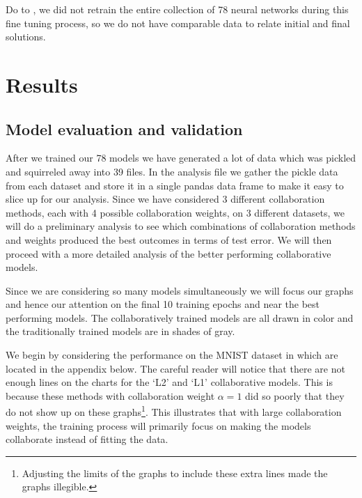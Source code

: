 \documentclass[english,a4paper,oneside]{amsart}
\theoremstyle{definition}
\begin{document}
Do to , we did not retrain the entire collection of 78 neural networks during this fine tuning process, so we do not have comparable data to relate initial and final solutions. 

\section{Results}
\subsection{Model evaluation and validation}
After we trained our 78 models we have generated a lot of data which was pickled and squirreled away into 39 files. In the analysis file we gather the pickle data from each dataset and store it in a single pandas data frame to make it easy to slice up for our analysis. Since we have considered 3 different collaboration methods, each with 4 possible collaboration weights, on 3 different datasets, we will do a preliminary analysis to see which combinations of collaboration methods and weights produced the best outcomes in terms of test error. We will then proceed with a more detailed analysis of the better performing collaborative models. 

Since we are considering so many models simultaneously we will focus our graphs and hence our attention on the final 10 training epochs and near the best performing models. The collaboratively trained models are all drawn in color and the traditionally trained models are in shades of gray.

We begin by considering the performance on the MNIST dataset in  which are located in the appendix below. The careful reader will notice that there are not enough lines on the charts for the `L2' and `L1' collaborative models. This is because these methods with collaboration weight $\alpha=1$ did so poorly that they do not show up on these graphs\footnote{Adjusting the limits of the graphs to include these extra lines made the graphs illegible.}. This illustrates that with large collaboration weights, the training process will primarily focus on making the models collaborate instead of fitting the data. 
\end{document}
